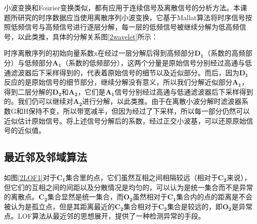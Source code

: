 \documentclass[a4paper,AutoFakeBold,oneside,12pt]{book}
\begin{document}
	小波变换和Fourier变换类似，都有应用于连续信号及离散信号的分析方法。本课题所研究的时序数据应当使用离散序列小波变换，它基于Mallat算法将时序信号按照低频信号与高频信号进行逐层分解，每一层的低频信号被继续分解为低高频信号，以此类推\cite{孙延奎2009小波分析及其工程应用}，具体的分解关系图\ref{2wavelet}所示：


	时序离散序列的初始向量系数x在经过一层分解后得到高频部分$\bm{D_1}$（系数的高频部分）与低频部分$\bm{A_1}$（系数的低频部分），这两个分量是原始信号分别经过高通与低通滤波器后下采样得到的，代表着原始信号的细节以及近似部分。而后，因为$\bm{D_1}$反应的是原始信号的细节部分，继续分解没有意义，所以我们分解近似部分$\bm{A_1}$，得到二层分解的$\bm{D_2}$和$\bm{A_2}$，它们是$\bm{A_1}$信号分别经过高通与低通滤波器后下采样得到的。我们仍可以继续对$\bm{A_2}$进行分解，以此类推。由于在离散小波分解时滤波器系数G和H保持不变，所以带宽减半，但因为经过了下采样，所以每一部分仍然可以近似估计原始信号。将上述信号分解后的系数，经过正交小波基，可以还原原始信号的近似值。

\subsection{最近邻及邻域算法}

	如图\ref{2LOF1}对于$\bm{C_1}$集合里的点，它们虽然互相之间相隔较远（相对于$\bm{C_2}$来说），但它们的互相之间的间距以及分散情况是均匀的，可以认为是统一集合而不是异常的离散点。$\bm{C_2}$集合显然是统一集合，而$\bm{O_2}$虽然相对于$\bm{C_1}$集合内的点的距离是不会被认为是孤立点，但是其距离最近的$\bm{C_2}$集合相对于$\bm{C_2}$集合是较远的，即$\bm{O_2}$是异常点。LOF算法从最近邻的思想展开，提供了一种检测异常的手段。

\end{document}
